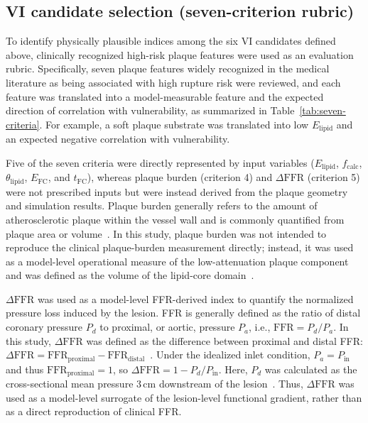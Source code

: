 \documentclass[master,english,final]{kaist-ucs}
\begin{document}
\subsection{VI candidate selection (seven-criterion rubric)}
To identify physically plausible indices among the six VI candidates defined above, clinically recognized high-risk plaque features were used as an evaluation rubric. Specifically, seven plaque features widely recognized in the medical literature as being associated with high rupture risk were reviewed, and each feature was translated into a model-measurable feature and the expected direction of correlation with vulnerability, as summarized in Table~\ref{tab:seven-criteria}. For example, a soft plaque substrate was translated into low $E_\mathrm{lipid}$ and an expected negative correlation with vulnerability.

Five of the seven criteria were directly represented by input variables ($E_\mathrm{lipid}$, $f_\mathrm{calc}$, $\theta_\mathrm{lipid}$, $E_\mathrm{FC}$, and $t_\mathrm{FC}$), whereas plaque burden (criterion 4) and $\Delta\mathrm{FFR}$ (criterion 5) were not prescribed inputs but were instead derived from the plaque geometry and simulation results. Plaque burden generally refers to the amount of atherosclerotic plaque within the vessel wall and is commonly quantified from plaque area or volume~\cite{mintz2001ivus}. In this study, plaque burden was not intended to reproduce the clinical plaque-burden measurement directly; instead, it was used as a model-level operational measure of the low-attenuation plaque component and was defined as the volume of the lipid-core domain~\cite{williams2020lap}.

$\Delta\mathrm{FFR}$ was used as a model-level FFR-derived index to quantify the normalized pressure loss induced by the lesion. FFR is generally defined as the ratio of distal coronary pressure $P_d$ to proximal, or aortic, pressure $P_a$, i.e., $\mathrm{FFR}=P_d/P_a$. In this study, $\Delta\mathrm{FFR}$ was defined as the difference between proximal and distal FFR: $\Delta\mathrm{FFR} = \mathrm{FFR}_\mathrm{proximal} - \mathrm{FFR}_\mathrm{distal}$~\cite{lee2019emerald}. Under the idealized inlet condition, $P_a=P_\mathrm{in}$ and thus $\mathrm{FFR}_\mathrm{proximal}=1$, so $\Delta\mathrm{FFR}=1-P_d/P_\mathrm{in}$. Here, $P_d$ was calculated as the cross-sectional mean pressure $3\,\mathrm{cm}$ downstream of the lesion~\cite{cami2018ffrct}. Thus, $\Delta\mathrm{FFR}$ was used as a model-level surrogate of the lesion-level functional gradient, rather than as a direct reproduction of clinical FFR.
\end{document}
